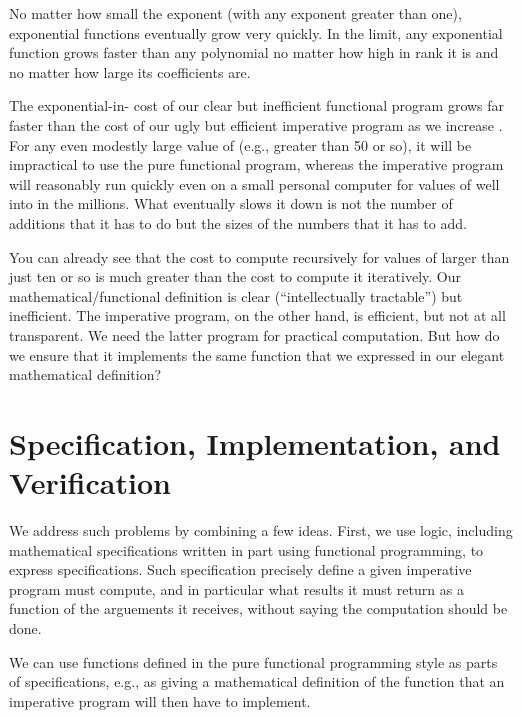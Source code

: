 \documentclass[letterpaper,10pt,english]{sphinxmanual}
\begin{document}
No matter how small the exponent (with any exponent greater than one),
exponential functions eventually grow very quickly. In the limit, any
exponential function grows faster than any polynomial no matter how
high in rank it is and no matter how large its coefficients are.

The exponential-in- cost of our clear but inefficient functional
program grows far faster than the cost of our ugly but efficient
imperative program as we increase .  For any even modestly large
value of  (e.g., greater than 50 or so), it will be impractical to
use the pure functional program, whereas the imperative program will
reasonably run quickly even on a small personal computer for values of
 well into in the millions.  What eventually slows it down is not
the number of additions that it has to do but the sizes of the numbers
that it has to add.

You can already see that the cost to compute  recursively for
values of  larger than just ten or so is much greater than the cost
to compute it iteratively. Our mathematical/functional definition is
clear (“intellectually tractable”) but inefficient. The imperative
program, on the other hand, is efficient, but not at all transparent.
We need the latter program for practical computation. But how do we
ensure that it implements the same function that we expressed in our
elegant mathematical definition?


\section{Specification, Implementation, and Verification}
\label{\detokenize{05-verifying-logical-specifications:specification-implementation-and-verification}}
We address such problems by combining a few ideas. First, we use
logic, including mathematical specifications written in part using
functional programming, to express  specifications.  Such
specification precisely define  a given imperative program must
compute, and in particular what results it must return as a function
of the arguements it receives, without saying  the computation
should be done.

We can use functions defined in the pure functional programming style
as parts of specifications, e.g., as giving a mathematical definition
of the  function that an imperative program will then have
to implement.
\end{document}
